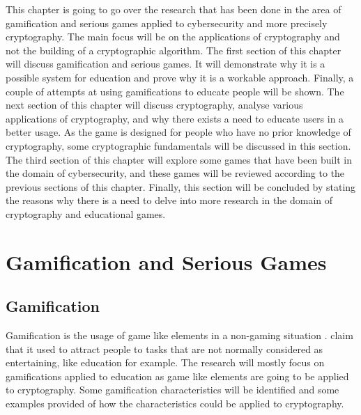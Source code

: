 \documentclass{l4proj}
\begin{document}
This chapter is going to go over the research that has been done in the area of gamification and serious games applied to cybersecurity and more precisely cryptography.
The main focus will be on the applications of cryptography and not the building of a cryptographic algorithm.
The first section of this chapter will discuss gamification and serious games. It will demonstrate why it is a possible system for education and prove why it is a workable approach.
Finally, a couple of attempts at using gamifications to educate people will be shown.
The next section of this chapter will discuss cryptography, analyse various applications of cryptography, and why there exists a need to educate users in a better usage.
As the game is designed for people who have no prior knowledge of cryptography, some cryptographic fundamentals will be discussed in this section.
The third section of this chapter will explore some games that have been built in the domain of cybersecurity, and these games will be reviewed according to the previous sections of this chapter.
Finally, this section will be concluded by stating the reasons why there is a need to delve into more research in the domain of cryptography and educational games.

\section{Gamification and Serious Games}

\subsection{Gamification}
Gamification is the usage of game like elements in a non-gaming situation \citep{aparicio_analysis_2012}.
\citet{aparicio_analysis_2012} claim that it used to attract people to tasks that are not normally considered as entertaining, like education for example.
The research will mostly focus on gamifications applied to education as game like elements are going to be applied to cryptography.
Some gamification characteristics will be identified and some examples provided of how the characteristics could be applied to cryptography.
\end{document}
